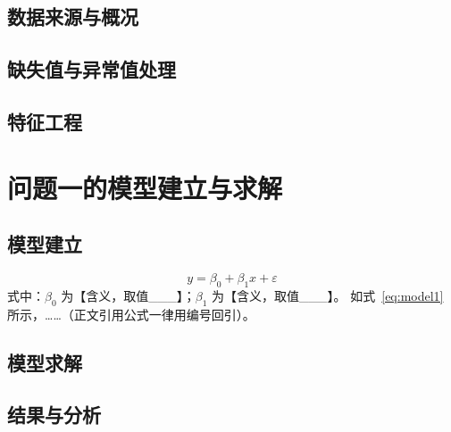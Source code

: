 \documentclass[12pt]{article}
\begin{document}
\subsection{数据来源与概况}

\subsection{缺失值与异常值处理}

\subsection{特征工程}

\section{问题一的模型建立与求解}
\subsection{模型建立}
\begin{equation}
y = \beta_0 + \beta_1 x + \varepsilon
\label{eq:model1}
\end{equation}
式中：$\beta_0$ 为【含义，取值___】；$\beta_1$ 为【含义，取值___】。
如式~\eqref{eq:model1} 所示，……（正文引用公式一律用编号回引）。

\subsection{模型求解}

\subsection{结果与分析}
\end{document}
